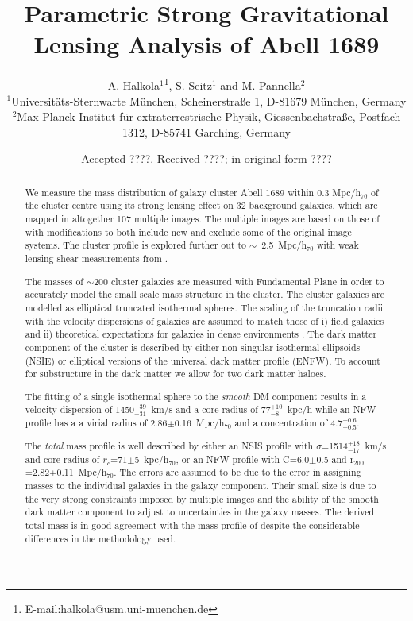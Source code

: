 \documentclass[useAMS,usenatbib]{mn2e}
\title{Parametric Strong Gravitational Lensing Analysis of Abell 1689}
\author[A. Halkola, S. Seitz and M. Pannella]
       {A. Halkola$^1$\thanks{E-mail:halkola@usm.uni-muenchen.de},
	 S. Seitz$^{1}$ and 
	 M. Pannella$^{2}$\\
	 $^{1}$Universit\"ats-Sternwarte M\"unchen, Scheinerstra\ss e 1, D-81679 M\"unchen, Germany\\
	 $^{2}$Max-Planck-Institut f\"ur extraterrestrische Physik, Giessenbachstra\ss e, Postfach 1312, D-85741 Garching, Germany}
\newcounter{one}   \setcounter{one}{1}
\newcounter{two}   \setcounter{two}{2}
\begin{document}
	 
  \date{Accepted ????. Received ????; in original form ????}
  \pagerange{\pageref{firstpage}--\pageref{lastpage}} 

  \maketitle

  \label{firstpage}

  \begin{abstract}

    We measure the mass distribution of galaxy cluster Abell 1689
    within $0.3$ Mpc/h$_{70}$ of the cluster centre using its strong
    lensing effect on 32 background galaxies, which are mapped in
    altogether 107 multiple images. The multiple images are based on
    those of \citet{broadhurst:05} with modifications to both include
    new and exclude some of the original image systems. The cluster
    profile is explored further out to $\sim$~2.5~Mpc/h$_{70}$ with
    weak lensing shear measurements from \citet{broadhurst:05b}.

    The masses of $\sim$200 cluster galaxies are measured with
    Fundamental Plane in order to accurately model the small scale
    mass structure in the cluster. The cluster galaxies are modelled
    as elliptical truncated isothermal spheres. The scaling of the
    truncation radii with the velocity dispersions of galaxies are
    assumed to match those of i) field galaxies \citep{hoekstra:04}
    and ii) theoretical expectations for galaxies in dense
    environments \citep{merritt:83}. The dark matter component of the
    cluster is described by either non-singular isothermal ellipsoids
    (NSIE) or elliptical versions of the universal dark matter profile
    (ENFW). To account for substructure in the dark matter we allow
    for two dark matter haloes.

    The fitting of a single isothermal sphere to the {\it smooth} DM
    component results in a velocity dispersion of
    1450$^{+39}_{-31}$~km/s and a core radius of 77$^{+10}_{-8}$~kpc/h
    while an NFW profile has a a virial radius of
    2.86$\pm$0.16~Mpc/h$_{70}$ and a concentration of
    4.7$^{+0.6}_{-0.5}$.

    The {\it total} mass profile is well described by either an NSIS
    profile with $\sigma$=1514$_{-17}^{+18}$~km/s and core radius of
    $r_c$=71$\pm$5~kpc/h$_{70}$, or an NFW profile with C=6.0$\pm$0.5
    and r$_{200}$=2.82$\pm$0.11~Mpc/h$_{70}$.  The errors are assumed
    to be due to the error in assigning masses to the individual
    galaxies in the galaxy component. Their small size is due to the
    very strong constraints imposed by multiple images and the ability
    of the smooth dark matter component to adjust to uncertainties in
    the galaxy masses. The derived total mass is in good agreement
    with the mass profile of \citet{broadhurst:05} despite the
    considerable differences in the methodology used.


\end{abstract}
\end{document}
